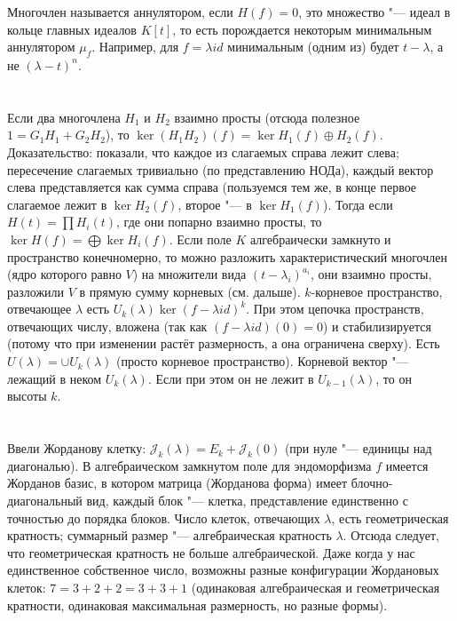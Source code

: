 Многочлен называется аннулятором, если $H(f) = 0$, это множество "--- идеал в кольце главных идеалов $K[t]$, то есть порождается некоторым минимальным аннулятором $\mu_f$.
Например, для $f=\lambda id$ минимальным (одним из) будет $t-\lambda$, а не $(\lambda - t)^n$.

\section{} %
Если два многочлена $H_1$ и $H_2$ взаимно просты (отсюда полезное $1=G_1H_1+G_2H_2$), то $\ker (H_1H_2)(f) = \ker H_1(f) \oplus H_2(f)$.
Доказательство:
показали, что каждое из слагаемых справа лежит слева;
пересечение слагаемых тривиально (по представлению НОДа),
каждый вектор слева представляется как сумма справа (пользуемся тем же, в конце первое слагаемое лежит в $\ker H_2(f)$, второе "--- в $\ker H_1(f)$).
Тогда если $H(t)=\prod H_i(t)$, где они попарно взаимно просты, то $\ker H(f) = \bigoplus \ker H_i(f)$.
Если поле $K$ алгебраически замкнуто и пространство конечномерно, то можно разложить характеристический многочлен (ядро которого равно $V$)
на множители вида $(t-\lambda_i)^{a_i}$, они взаимно просты, разложили $V$ в прямую сумму корневых (см. дальше).
$k$-корневое пространство, отвечающее $\lambda$ есть $U_k(\lambda) \ker (f-\lambda id)^k$.
При этом цепочка пространств, отвечающих числу, вложена (так как $(f-\lambda id)(0)=0$) и стабилизируется (потому что при изменении растёт размерность, а она ограничена сверху).
Есть $U(\lambda) = \cup U_k(\lambda)$ (просто корневое пространство).
Корневой вектор "--- лежащий в неком $U_k(\lambda)$.
Если при этом он не лежит в $U_{k-1}(\lambda)$, то он высоты $k$.

\section{} %
Ввели Жорданову клетку: $\mathcal{J}_k(\lambda)=E_k+\mathcal{J}_k(0)$ (при нуле "--- единицы над диагональю).
В алгебраическом замкнутом поле для эндоморфизма $f$ имеется Жорданов базис, в котором матрица (Жорданова форма) имеет блочно-диагональный вид,
каждый блок "--- клетка, представление единственно с точностью до порядка блоков.
Число клеток, отвечающих $\lambda$, есть геометрическая кратность; суммарный размер "--- алгебраическая кратность $\lambda$.
Отсюда следует, что геометрическая кратность не больше алгебраической.
Даже когда у нас единственное собственное число, возможны разные конфигурации Жордановых клеток: $7=3+2+2=3+3+1$ (одинаковая алгебраическая и геометрическая кратности, одинаковая максимальная размерность, но разные формы).

